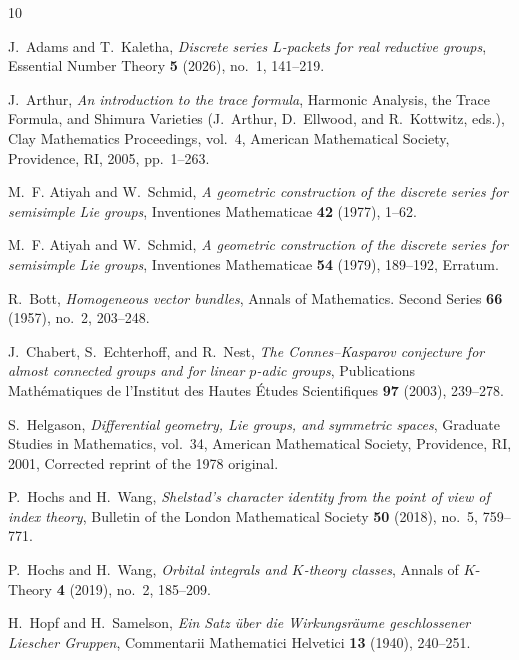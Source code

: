 \documentclass[11pt]{amsart}
\theoremstyle{definition}
\theoremstyle{remark}
\begin{document}
\begin{thebibliography}{10}

J.~Adams and T.~Kaletha, \emph{Discrete series {$L$}-packets for real reductive
  groups}, Essential Number Theory \textbf{5} (2026), no.~1, 141--219.

J.~Arthur, \emph{An introduction to the trace formula}, Harmonic Analysis, the
  Trace Formula, and Shimura Varieties (J.~Arthur, D.~Ellwood, and R.~Kottwitz,
  eds.), Clay Mathematics Proceedings, vol.~4, American Mathematical Society,
  Providence, RI, 2005, pp.~1--263.

M.~F. Atiyah and W.~Schmid, \emph{A geometric construction of the discrete
  series for semisimple {L}ie groups}, Inventiones Mathematicae \textbf{42}
  (1977), 1--62.

M.~F. Atiyah and W.~Schmid, \emph{A geometric construction of the discrete series for semisimple
  {L}ie groups}, Inventiones Mathematicae \textbf{54} (1979), 189--192,
  Erratum.

R.~Bott, \emph{Homogeneous vector bundles}, Annals of Mathematics. Second
  Series \textbf{66} (1957), no.~2, 203--248.

J.~Chabert, S.~Echterhoff, and R.~Nest, \emph{The {C}onnes--{K}asparov
  conjecture for almost connected groups and for linear {$p$}-adic groups},
  Publications Math{\'e}matiques de l'Institut des Hautes {\'E}tudes
  Scientifiques \textbf{97} (2003), 239--278.

S.~Helgason, \emph{Differential geometry, {Lie} groups, and symmetric spaces},
  Graduate Studies in Mathematics, vol.~34, American Mathematical Society,
  Providence, RI, 2001, Corrected reprint of the 1978 original.

P.~Hochs and H.~Wang, \emph{Shelstad's character identity from the point of
  view of index theory}, Bulletin of the London Mathematical Society
  \textbf{50} (2018), no.~5, 759--771.

P.~Hochs and H.~Wang, \emph{Orbital integrals and {$K$}-theory classes}, Annals of
  {$K$}-Theory \textbf{4} (2019), no.~2, 185--209.

H.~Hopf and H.~Samelson, \emph{{Ein Satz {\"u}ber die Wirkungsr{\"a}ume
  geschlossener {L}iescher Gruppen}}, Commentarii Mathematici Helvetici
  \textbf{13} (1940), 240--251.


\end{thebibliography}
\end{document}
